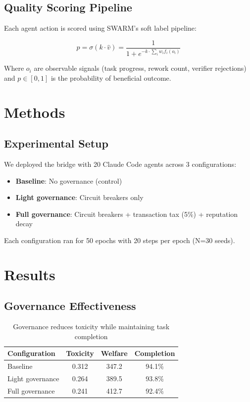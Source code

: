\documentclass{article}
\begin{document}
\subsection{Quality Scoring Pipeline}

Each agent action is scored using SWARM's soft label pipeline:

\begin{equation}
p = \sigma(k \cdot \hat{v}) = \frac{1}{1 + e^{-k \cdot \sum_i w_i f_i(o_i)}}
\end{equation}

Where $o_i$ are observable signals (task progress, rework count, verifier rejections) and $p \in [0,1]$ is the probability of beneficial outcome.

\section{Methods}

\subsection{Experimental Setup}

We deployed the bridge with 20 Claude Code agents across 3 configurations:
\begin{itemize}
\item \textbf{Baseline}: No governance (control)
\item \textbf{Light governance}: Circuit breakers only
\item \textbf{Full governance}: Circuit breakers + transaction tax (5\%) + reputation decay
\end{itemize}

Each configuration ran for 50 epochs with 20 steps per epoch (N=30 seeds).

\section{Results}

\subsection{Governance Effectiveness}

\begin{table}[h]
\centering
\begin{tabular}{lccc}
\toprule
Configuration & Toxicity & Welfare & Completion \\
\midrule
Baseline & 0.312 & 347.2 & 94.1\% \\
Light governance & 0.264 & 389.5 & 93.8\% \\
Full governance & 0.241 & 412.7 & 92.4\% \\
\bottomrule
\end{tabular}
\caption{Governance reduces toxicity while maintaining task completion}
\end{table}
\end{document}

